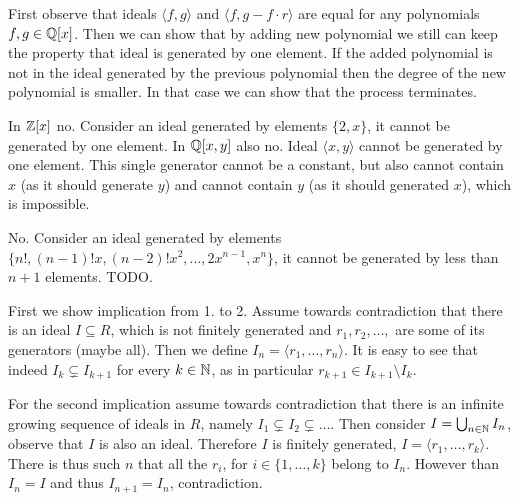 {
First observe that ideals $\langle f, g \rangle$ and $\langle f, g - f \cdot r \rangle$ are equal for any polynomials $f, g \in \mathbb Q[x]$.
Then we can show that by adding new polynomial we still can keep the property that ideal is generated by one element.
If the added polynomial is not in the ideal generated by the previous polynomial then the degree of the new polynomial is smaller.
In that case we can show that the process terminates.
}


{
In $\mathbb Z[x]$ no. Consider an ideal generated by elements $\{2, x\}$, it cannot be generated by one element.
In $\mathbb Q[x, y]$ also no. Ideal $\langle x, y \rangle$ cannot be generated by one element. This single generator cannot be a constant,
but also cannot contain $x$ (as it should generate $y$) and cannot contain $y$ (as it should generated $x$), which is impossible.
}




{
No. Consider an ideal generated by elements $\{n!, (n-1)! x, (n-2)!x^2, \ldots, 2 x^{n-1}, x^n\}$, it cannot be generated by less
than $n+1$ elements. TODO.
}




{
First we show implication from 1. to 2. Assume towards contradiction that there is an ideal $I \subseteq R$,
which is not finitely generated and $r_1, r_2, \ldots, $ are some of its generators (maybe all).
Then we define $I_n = \langle r_1, \ldots, r_n \rangle$. It is easy to see that indeed $I_k \subsetneq I_{k+1}$
for every $k \in \mathbb{N}$, as in particular $r_{k+1} \in I_{k+1} \setminus I_k$.

For the second implication assume towards contradiction that there is an infinite growing sequence
of ideals in $R$, namely $I_1 \subsetneq I_2 \subsetneq \ldots$. Then consider $I = \bigcup_{n \in \mathbb{N}} I_n$, observe
that $I$ is also an ideal. Therefore $I$ is finitely generated, $I = \langle r_1, \ldots, r_k \rangle$.
There is thus such $n$ that all the $r_i$, for $i \in \{1, \ldots, k\}$ belong to $I_n$.
However than $I_n = I$ and thus $I_{n+1} = I_n$, contradiction.
}




